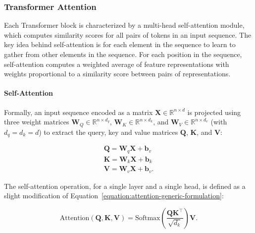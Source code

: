 
\subsubsection{Transformer Attention}

Each Transformer block is characterized by a multi-head self-attention module, which computes similarity scores for all pairs of tokens in an input sequence. The key idea behind self-attention is for each element in the sequence to learn to gather from other elements in the sequence. For each position in the sequence, self-attention computes a weighted average of feature representations with weights proportional to a similarity score between pairs of representations. 

\paragraph{Self-Attention} Formally, an input sequence encoded as a matrix $\bm{X} \in \mathbb{R}^{n \times d}$ is projected using three weight matrices $\bm{W}_Q \in \mathbb{R}^{n \times d_q}$, $\bm{W}_K \in \mathbb{R}^{n \times d_k}$, and $\bm{W}_V \in \mathbb{R}^{n \times d_v}$ (with $d_q = d_k = d$) to extract the query, key and value matrices $\bm{Q}$, $\bm{K}$, and $\bm{V}$:

\begin{equation}
\begin{aligned}
    \bm{Q} = \bm{W}_q \bm{X} + \bm{b}_v \\
    \bm{K} = \bm{W}_k \bm{X} + \bm{b}_k \\
    \bm{V} = \bm{W}_v \bm{X} + \bm{b}_v.
\end{aligned}    
\end{equation}
 

The self-attention operation, for a single layer and a single head, is defined as a slight modification of Equation~\ref{equation:attention-generic-formulation}:

\begin{equation}
    \text{Attention}(\bm{Q}, \bm{K}, \bm{V}) = \text{Softmax}\left(\dfrac{\bm{Q}\bm{K}^\top}{\sqrt{d_k}}\right)\bm{V}.
\end{equation}

